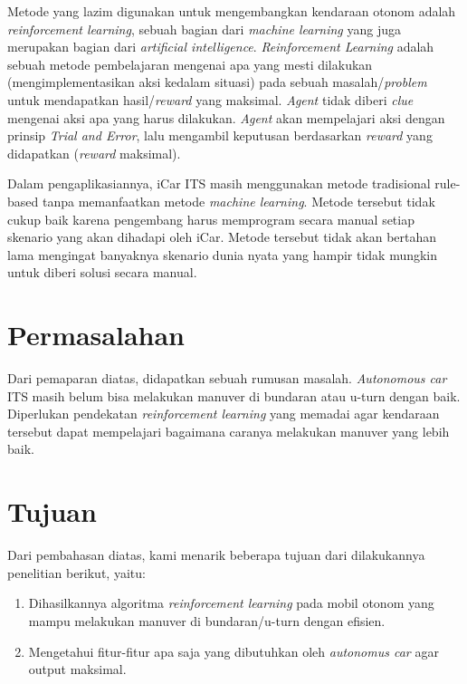 Metode yang lazim digunakan untuk mengembangkan kendaraan otonom adalah \textit{reinforcement learning}, sebuah bagian dari \textit{machine learning }yang juga merupakan bagian dari \textit{artificial intelligence}. \textit{Reinforcement Learning }adalah sebuah metode pembelajaran mengenai apa yang mesti dilakukan (mengimplementasikan aksi kedalam situasi) pada sebuah masalah/\textit{problem }untuk mendapatkan hasil/\textit{reward }yang maksimal. \textit{Agent }tidak diberi \textit{clue }mengenai aksi apa yang harus dilakukan. \textit{Agent }akan mempelajari aksi dengan prinsip \textit{Trial and Error}, lalu mengambil keputusan berdasarkan \textit{reward }yang didapatkan (\textit{reward }maksimal).

Dalam pengaplikasiannya, iCar ITS masih menggunakan metode tradisional rule-based tanpa memanfaatkan metode \textit{machine learning}. Metode tersebut tidak cukup baik karena pengembang harus memprogram secara manual setiap skenario yang akan dihadapi oleh iCar. Metode tersebut tidak akan bertahan lama mengingat banyaknya skenario dunia nyata yang hampir tidak mungkin untuk diberi solusi secara manual.

\section{Permasalahan}
\label{sec:permasalahan}

Dari pemaparan diatas, didapatkan sebuah rumusan masalah. \textit{Autonomous car }ITS masih belum bisa melakukan manuver di bundaran atau u-turn dengan baik. Diperlukan pendekatan \textit{reinforcement learning }yang memadai agar kendaraan tersebut dapat mempelajari bagaimana caranya melakukan manuver yang lebih baik.
	


\section{Tujuan}
\label{sec:Tujuan}

Dari pembahasan diatas, kami menarik beberapa tujuan dari dilakukannya penelitian berikut, yaitu:
\begin{enumerate}[nolistsep]
	\item Dihasilkannya algoritma \textit{reinforcement learning }pada mobil otonom yang mampu melakukan manuver di bundaran/u-turn dengan efisien.
	\item Mengetahui fitur-fitur apa saja yang dibutuhkan oleh \textit{autonomus car }agar output maksimal.
	
	\iffalse
	Dapat dicontohkan seperti dimana lokasi dan berapa derajat kemiringan dari sensor pada kendaraan yang sebaiknya diaplikasikan.
	\fi
	
\end{enumerate}


